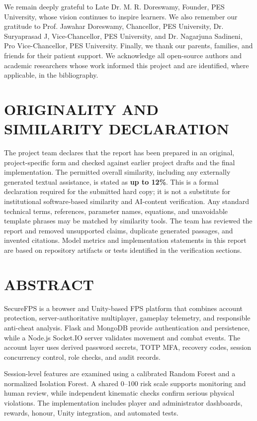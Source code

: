 \documentclass[12pt,a4paper,oneside]{report}
\begin{document}
We remain deeply grateful to Late Dr. M. R. Doreswamy, Founder, PES University, whose vision continues to inspire learners. We also remember our gratitude to Prof. Jawahar Doreswamy, Chancellor, PES University, Dr. Suryaprasad J, Vice-Chancellor, PES University, and Dr. Nagarjuna Sadineni, Pro Vice-Chancellor, PES University. Finally, we thank our parents, families, and friends for their patient support. We acknowledge all open-source authors and academic researchers whose work informed this project and are identified, where applicable, in the bibliography.
\clearpage

\chapter*{ORIGINALITY AND SIMILARITY DECLARATION}
The project team declares that the report has been prepared in an original, project-specific form and checked against earlier project drafts and the final implementation. The permitted overall similarity, including any externally generated textual assistance, is stated as \textbf{up to 12\%}. This is a formal declaration required for the submitted hard copy; it is not a substitute for institutional software-based similarity and AI-content verification. Any standard technical terms, references, parameter names, equations, and unavoidable template phrases may be matched by similarity tools. The team has reviewed the report and removed unsupported claims, duplicate generated passages, and invented citations. Model metrics and implementation statements in this report are based on repository artifacts or tests identified in the verification sections.
\clearpage

\chapter*{ABSTRACT}
SecureFPS is a browser and Unity-based FPS platform that combines account protection, server-authoritative multiplayer, gameplay telemetry, and responsible anti-cheat analysis. Flask and MongoDB provide authentication and persistence, while a Node.js Socket.IO server validates movement and combat events. The account layer uses derived password secrets, TOTP MFA, recovery codes, session concurrency control, role checks, and audit records.

Session-level features are examined using a calibrated Random Forest and a normalized Isolation Forest. A shared 0--100 risk scale supports monitoring and human review, while independent kinematic checks confirm serious physical violations. The implementation includes player and administrator dashboards, rewards, honour, Unity integration, and automated tests.
\end{document}
